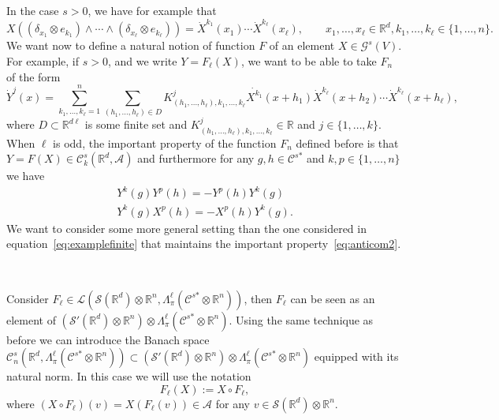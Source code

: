 \documentclass{article}
\newcommand{\assign}{:=}
\newcommand{\asterisk}{\mathord{*}}
\begin{document}
In the case $s > 0$, we have for example that
\[ X ((\delta_{x_1} \otimes e_{k_1}) \wedge \cdots \wedge (\delta_{x_{\ell}}
   \otimes e_{k_{\ell}})) = \dot{X}^{k_1} (x_1) \cdots \dot{X}^{k_{\ell}}
   (x_{\ell}), \qquad x_1, \ldots, x_{\ell} \in \mathbb{R}^d, k_1, \ldots,
   k_{\ell} \in \{ 1, \ldots, n \} . \]
We want now to define a natural notion of function $F$ of an element $X \in
\mathcal{G}^s (V)$. For example, if $s > 0$, and we write $Y = F_{\ell} (X)$,
we want to be able to take $F_n$ of the form
\begin{equation}
  \dot{Y}^j (x) = \sum_{k_1, \ldots, k_{\ell} = 1}^n \sum_{(h_1, \ldots,
  h_{\ell}) \in D} K^j_{(h_1, \ldots, h_{\ell}), k_1, \ldots, k_{\ell}}
  \dot{X^{k_1}} (x + h_1) \dot{X}^{k_{\ell}} (x + h_2) \cdots
  \dot{X}^{k_{\ell}} (x + h_{\ell}) \label{eq:examplefinite},
\end{equation}
where $D \subset \mathbb{R}^{d \ell}$ is some finite set and $K_{(h_1, \ldots,
h_{\ell}), k_1, \ldots, k_{\ell}}^j \in \mathbb{R}$ and $j \in \{ 1, \ldots, k
\}$. When $\ell$ is odd, the important property of the function $F_n$ defined
before is that $Y = F (X) \in \mathcal{C}^s_k (\mathbb{R}^d, \mathcal{A})$ and
furthermore for any $g, h \in \mathcal{C}^{s \asterisk}$ and $k, p \in \{ 1,
\ldots, n \}$ we have
\begin{equation}
  \begin{array}{c}
    Y^k (g) Y^p (h) = - Y^p (h) Y^k (g)\\
    Y^k (g) X^p (h) = - X^p (h) Y^k (g) .
  \end{array} \label{eq:anticom2}
\end{equation}
We want to consider some more general setting than the one considered in
equation~{\eqref{eq:examplefinite}} that maintains the important
property~{\eqref{eq:anticom2}}.

\

Consider $F_{\ell} \in \mathcal{L} (\mathcal{S} (\mathbb{R}^d) \otimes
\mathbb{R}^n, \Lambda^{\ell}_{\pi} (\mathcal{C}^{s \asterisk} \otimes
\mathbb{R}^n))$, then $F_{\ell}$ can be seen as an element of $(\mathcal{S}'
(\mathbb{R}^d) \otimes \mathbb{R}^n) \otimes \Lambda^{\ell}_{\pi}
(\mathcal{C}^{s \asterisk} \otimes \mathbb{R}^n)$. Using the same technique as
before we can introduce the Banach space $\mathcal{C}^s_n (\mathbb{R}^d,
\Lambda^{\ell}_{\pi} (\mathcal{C}^{s \asterisk} \otimes \mathbb{R}^n)) \subset
(\mathcal{S}' (\mathbb{R}^d) \otimes \mathbb{R}^n) \otimes
\Lambda^{\ell}_{\pi} (\mathcal{C}^{s \asterisk} \otimes \mathbb{R}^n)$
equipped with its natural norm. In this case we will use the notation
\begin{equation}
  F_{\ell} (X) \assign X \circ F_{\ell}, \label{eq:composition}
\end{equation}
where $(X \circ F_{\ell}) (v) = X (F_{\ell} (v)) \in \mathcal{A}$ for any $v
\in \mathcal{S} (\mathbb{R}^d) \otimes \mathbb{R}^n$.
\end{document}

